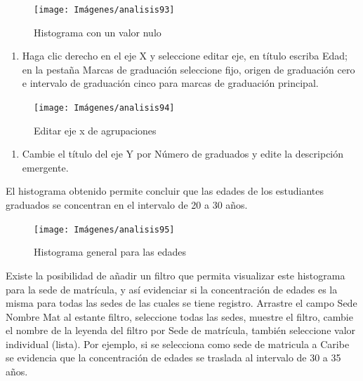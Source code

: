 \documentclass[
]{book}
\providecommand{\tightlist}{%
  \setlength{\itemsep}{0pt}\setlength{\parskip}{0pt}}
\begin{document}
\begin{figure}

{\centering \texttt{[image: Imágenes/analisis93]} 

}

\caption{Histograma con un valor nulo}\label{fig:paso6histograma-fig}
\end{figure}

\begin{enumerate}
\def\labelenumi{\arabic{enumi}.}
\setcounter{enumi}{6}
\tightlist
\item
  Haga clic derecho en el eje X y seleccione editar eje, en título escriba Edad; en la pestaña Marcas de graduación seleccione fijo, origen de graduación cero e intervalo de graduación cinco para marcas de graduación principal.
\end{enumerate}

\begin{figure}

{\centering \texttt{[image: Imágenes/analisis94]} 

}

\caption{Editar eje x de agrupaciones}\label{fig:paso7histograma-fig}
\end{figure}

\begin{enumerate}
\def\labelenumi{\arabic{enumi}.}
\setcounter{enumi}{7}
\tightlist
\item
  Cambie el título del eje Y por Número de graduados y edite la descripción emergente.
\end{enumerate}

El histograma obtenido permite concluir que las edades de los estudiantes graduados se concentran en el intervalo de 20 a 30 años.

\begin{figure}

{\centering \texttt{[image: Imágenes/analisis95]} 

}

\caption{Histograma general para las edades}\label{fig:histogramabase-fig}
\end{figure}

Existe la posibilidad de añadir un filtro que permita visualizar este histograma para la sede de matrícula, y así evidenciar si la concentración de edades es la misma para todas las sedes de las cuales se tiene registro. Arrastre el campo Sede Nombre Mat al estante filtro, seleccione todas las sedes, muestre el filtro, cambie el nombre de la leyenda del filtro por Sede de matrícula, también seleccione valor individual (lista). Por ejemplo, si se selecciona como sede de matricula a Caribe se evidencia que la concentración de edades se traslada al intervalo de 30 a 35 años.
\end{document}

